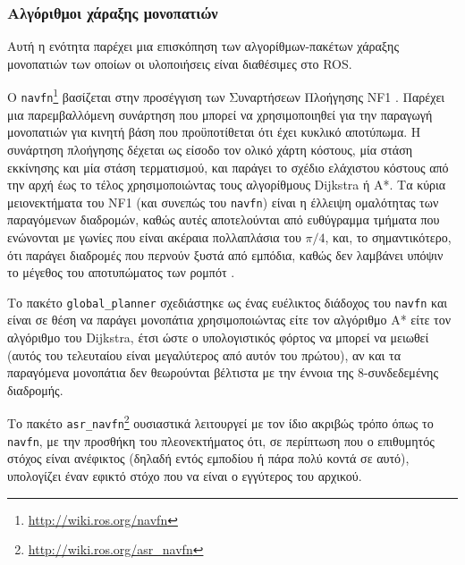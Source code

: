 \subsubsection{Αλγόριθμοι χάραξης μονοπατιών}
\label{subsubsection:02_01_02:03_01}

Αυτή η ενότητα παρέχει μια επισκόπηση των αλγορίθμων-πακέτων χάραξης μονοπατιών
των οποίων οι υλοποιήσεις είναι διαθέσιμες στο ROS.

O \texttt{navfn}\footnote{\url{http://wiki.ros.org/navfn}} βασίζεται στην
προσέγγιση των Συναρτήσεων Πλοήγησης NF1 \cite{Latombe1991}. Παρέχει μια
παρεμβαλλόμενη συνάρτηση που μπορεί να χρησιμοποιηθεί για την παραγωγή
μονοπατιών για κινητή βάση που προϋποτίθεται ότι έχει κυκλικό αποτύπωμα. Η
συνάρτηση πλοήγησης δέχεται ως είσοδο τον ολικό χάρτη κόστους, μία στάση
εκκίνησης και μία στάση τερματισμού, και παράγει το σχέδιο ελάχιστου κόστους
από την αρχή έως το τέλος χρησιμοποιώντας τους αλγορίθμους Dijkstra ή A*. Τα
κύρια μειονεκτήματα του NF1 (και συνεπώς του \texttt{navfn}) είναι η έλλειψη
ομαλότητας των παραγόμενων διαδρομών, καθώς αυτές αποτελούνται από ευθύγραμμα
τμήματα που ενώνονται με γωνίες που είναι ακέραια πολλαπλάσια του $\pi/4$, και,
το σημαντικότερο, ότι παράγει διαδρομές που περνούν ξυστά από εμπόδια, καθώς
δεν λαμβάνει υπόψιν το μέγεθος του αποτυπώματος των ρομπότ \cite{Philippsen2004}.

Το πακέτο \texttt{global\_planner} σχεδιάστηκε ως ένας ευέλικτος διάδοχος του
\texttt{navfn} και είναι σε θέση να παράγει μονοπάτια χρησιμοποιώντας είτε τον
αλγόριθμο A* είτε τον αλγόριθμο του Dijkstra, έτσι ώστε ο υπολογιστικός φόρτος
να μπορεί να μειωθεί (αυτός του τελευταίου είναι μεγαλύτερος από αυτόν του
πρώτου), αν και τα παραγόμενα μονοπάτια δεν θεωρούνται βέλτιστα με την έννοια
της 8-συνδεδεμένης διαδρομής.

Το πακέτο \texttt{asr\_navfn}\footnote{\url{http://wiki.ros.org/asr\_navfn}}
ουσιαστικά λειτουργεί με τον ίδιο ακριβώς τρόπο όπως το \texttt{navfn}, με την
προσθήκη του πλεονεκτήματος ότι, σε περίπτωση που ο επιθυμητός στόχος είναι
ανέφικτος (δηλαδή εντός εμποδίου ή πάρα πολύ κοντά σε αυτό), υπολογίζει έναν
εφικτό στόχο που να είναι ο εγγύτερος του αρχικού.

